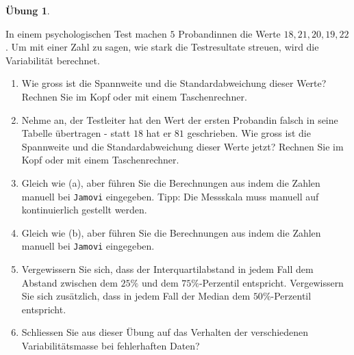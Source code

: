 \documentclass[
]{book}
\providecommand{\tightlist}{%
  \setlength{\itemsep}{0pt}\setlength{\parskip}{0pt}}
\theoremstyle{definition}
\theoremstyle{definition}
\theoremstyle{definition}
\newtheorem{exercise}{Übung}[chapter]
\theoremstyle{definition}
\theoremstyle{remark}
\begin{document}
\begin{exercise}
\protect\hypertarget{exr:theorie-variabilitaet}{}\label{exr:theorie-variabilitaet}\leavevmode

In einem psychologischen Test machen \(5\) Probandinnen die Werte \(18, 21, 20, 19, 22\). Um mit einer Zahl zu sagen, wie stark die Testresultate streuen, wird die Variabilität berechnet.

\begin{enumerate}
\def\labelenumi{(\alph{enumi})}
\tightlist
\item
  Wie gross ist die Spannweite und die Standardabweichung dieser Werte? Rechnen Sie im Kopf oder mit einem Taschenrechner.
\item
  Nehme an, der Testleiter hat den Wert der ersten Probandin falsch in seine Tabelle übertragen - statt \(18\) hat er \(81\) geschrieben. Wie gross ist die Spannweite und die Standardabweichung dieser Werte jetzt? Rechnen Sie im Kopf oder mit einem Taschenrechner.
\item
  Gleich wie (a), aber führen Sie die Berechnungen aus indem die Zahlen manuell bei \texttt{Jamovi} eingegeben. Tipp: Die Messskala muss manuell auf kontinuierlich gestellt werden.
\item
  Gleich wie (b), aber führen Sie die Berechnungen aus indem die Zahlen manuell bei \texttt{Jamovi} eingegeben.
\item
  Vergewissern Sie sich, dass der Interquartilabstand in jedem Fall dem Abstand zwischen dem \(25\%\) und dem \(75\%\)-Perzentil entspricht. Vergewissern Sie sich zusätzlich, dass in jedem Fall der Median dem \(50\%\)-Perzentil entspricht.
\item
  Schliessen Sie aus dieser Übung auf das Verhalten der verschiedenen Variabilitätsmasse bei fehlerhaften Daten?
\end{enumerate}

\end{exercise}
\end{document}
